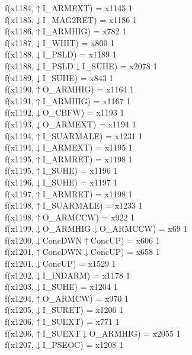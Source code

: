 f(x1184,$\uparrow$I\_ARMEXT) = x1145 {1} \\
f(x1185,$\downarrow$I\_MAG2RET) = x1186 {1} \\
f(x1186,$\uparrow$I\_ARMHIG) = x782 {1} \\
f(x1187,$\downarrow$I\_WHIT) = x800 {1} \\
f(x1188,$\downarrow$I\_PSLD) = x1189 {1} \\
f(x1188,$\downarrow$I\_PSLD$\downarrow$I\_SUHE) = x2078 {1} \\
f(x1189,$\downarrow$I\_SUHE) = x843 {1} \\
f(x1190,$\uparrow$O\_ARMHIG) = x1164 {1} \\
f(x1191,$\uparrow$I\_ARMHIG) = x1167 {1} \\
f(x1192,$\downarrow$O\_CBFW) = x1193 {1} \\
f(x1193,$\downarrow$O\_ARMEXT) = x1194 {1} \\
f(x1194,$\uparrow$I\_SUARMALE) = x1231 {1} \\
f(x1194,$\downarrow$I\_ARMEXT) = x1195 {1} \\
f(x1195,$\uparrow$I\_ARMRET) = x1198 {1} \\
f(x1195,$\uparrow$I\_SUHE) = x1196 {1} \\
f(x1196,$\downarrow$I\_SUHE) = x1197 {1} \\
f(x1197,$\uparrow$I\_ARMRET) = x1198 {1} \\
f(x1198,$\uparrow$I\_SUARMALE) = x1233 {1} \\
f(x1198,$\uparrow$O\_ARMCCW) = x922 {1} \\
f(x1199,$\downarrow$O\_ARMHIG$\downarrow$O\_ARMCCW) = x69 {1} \\
f(x1200,$\downarrow$ConcDWN$\uparrow$ConcUP) = x606 {1} \\
f(x1201,$\uparrow$ConcDWN$\downarrow$ConcUP) = x658 {1} \\
f(x1201,$\downarrow$ConcUP) = x1529 {1} \\
f(x1202,$\downarrow$I\_INDARM) = x1178 {1} \\
f(x1203,$\downarrow$I\_SUHE) = x1204 {1} \\
f(x1204,$\uparrow$O\_ARMCW) = x970 {1} \\
f(x1205,$\downarrow$I\_SURET) = x1206 {1} \\
f(x1206,$\uparrow$I\_SUEXT) = x771 {1} \\
f(x1206,$\uparrow$I\_SUEXT$\downarrow$O\_ARMHIG) = x2055 {1} \\
f(x1207,$\downarrow$I\_PSEOC) = x1208 {1} \\
